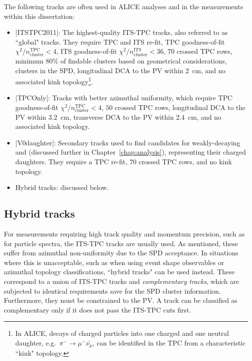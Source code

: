 The following tracks are often used in ALICE analyses and in the measurements within this dissertation:
\begin{itemize}
\item \spverb|ITSTPC2011|: The highest-quality ITS-TPC tracks, also referred to as ``global" tracks. They require TPC and ITS re-fit, TPC goodness-of-fit $\chi^2/n_\mathrm{cluster}^\mathrm{TPC} < 4$, ITS goodness-of-fit $\chi^2/n_\mathrm{cluster}^\mathrm{ITS} < 36$, $70$ crossed TPC rows, minimum $80\%$ of findable clusters based on geometrical considerations, clusters in the SPD, longitudinal DCA to the PV within $2$~cm, and no associated kink topology\footnote{In ALICE, decays of charged particles into one charged and one neutral daughter, e.g.\ $\pi^- \to \mu^- \bar{\nu_\mu}$, can be identified in the TPC from a characteristic ``kink" topology.}.
\item \spverb|TPCOnly|: Tracks with better azimuthal uniformity, which require TPC goodness-of-fit $\chi^2/n_\mathrm{cluster}^\mathrm{TPC} < 4$, $50$ crossed TPC rows, longitudinal DCA to the PV within $3.2$~cm, transverse DCA to the PV within $2.4$~cm, and no associated kink topology.
\item \spverb|V0daughter|: Secondary tracks used to find candidates for weakly-decaying \KOs and \LA (discussed further in Chapter~\ref{chap:analysis}), representing their charged daughters. They require a TPC re-fit, $70$ crossed TPC rows, and no kink topology.
\item Hybrid tracks: discussed below.
\end{itemize}

\subsection{Hybrid tracks}

For measurements requiring high track quality and momentum precision, such as for particle \pt spectra, the ITS-TPC tracks are usually used. As mentioned, these suffer from azimuthal non-uniformity due to the SPD acceptance. In situations where this is unacceptable, such as when using event shape observables or azimuthal topology classifications, ``hybrid tracks" can be used instead. These correspond to a union of ITS-TPC tracks and \textit{complementary tracks}, which are subjected to identical requirements save for the SPD cluster information. Furthermore, they must be constrained to the PV. A track can be classified as complementary only if it does not pass the ITS-TPC cuts first.

